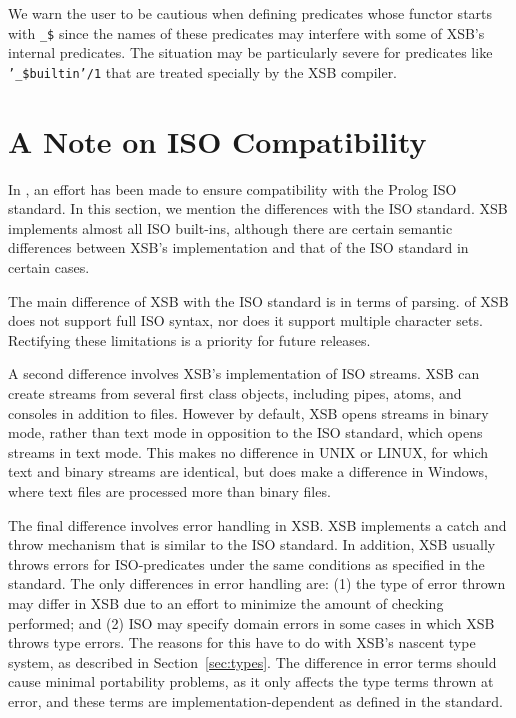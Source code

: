 We warn the user to be cautious when defining predicates whose functor
starts with {\tt \_\$} since the names of these predicates may
interfere with some of XSB's internal predicates.  The situation may
be particularly severe for predicates like {\tt '\_\$builtin'/1} that
are treated specially by the XSB compiler.

\section{A Note on ISO Compatibility} \label{sec:iso}

In \version, an effort has been made to ensure compatibility with the
Prolog ISO standard.  In this section, we mention the differences with
the ISO standard.  XSB implements almost all ISO built-ins, although
there are certain semantic differences between XSB's implementation
and that of the ISO standard in certain cases.

The main difference of XSB with the ISO standard is in terms of
parsing.  \version{} of XSB does not support full ISO syntax, nor does
it support multiple character sets.  Rectifying these limitations is a
priority for future releases.

A second difference involves XSB's implementation of ISO streams.  XSB
can create streams from several first class objects, including pipes,
atoms, and consoles in addition to files.  However by default, XSB
opens streams in binary mode, rather than text mode in opposition to
the ISO standard, which opens streams in text mode.  This makes no
difference in UNIX or LINUX, for which text and binary streams are
identical, but does make a difference in Windows, where text files are
processed more than binary files.


The final difference involves error handling in XSB.  XSB implements a
catch and throw mechanism that is similar to the ISO standard.  In
addition, XSB usually throws errors for ISO-predicates under the same
conditions as specified in the standard.  The only differences in
error handling are: (1) the type of error thrown may differ in XSB due
to an effort to minimize the amount of checking performed; and (2) ISO
may specify domain errors in some cases in which XSB throws type
errors.  The reasons for this have to do with XSB's nascent type
system, as described in Section~\ref{sec:types}.  The difference in
error terms should cause minimal portability problems, as it only
affects the type terms thrown at error, and these terms are
implementation-dependent as defined in the standard.




